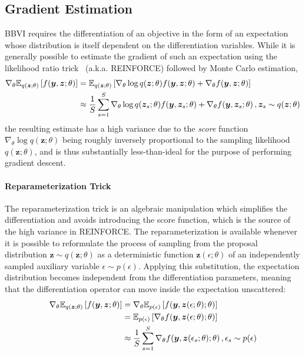 \documentclass[11pt]{article}
\begin{document}
\subsection{Gradient Estimation}

BBVI requires the differentiation of an objective in the form of an expectation
whose distribution is itself dependent on the differentiation variables.  While
it is generally possible to estimate the gradient of such an expectation using
the likelihood ratio trick~\cite{williams_simple_1992} (a.k.a. REINFORCE)
followed by Monte Carlo estimation,
%
\begin{align}
  \nabla_\theta {\mathbb{E}}_{q(\bm z;\theta)}\left[ f(\bm y, \bm z; \theta) \right] &=
  {\mathbb{E}}_{q(\bm z;\theta)}\left[ \nabla_\theta \log q(\bm z;\theta) f(\bm y, \bm
  z; \theta) + \nabla_\theta f(\bm y, \bm z; \theta) \right] \nonumber \\
  &\approx \frac{1}{S} \sum_{s=1}^S \nabla_\theta \log q(\bm z_s; \theta) f(\bm
  y, \bm z_s; \theta) + \nabla_\theta f(\bm y, \bm z_s; \theta) \,, \bm z_s
  \sim q(\bm z; \theta)
\end{align}
%
\noindent the resulting estimate has a high variance due to the \emph{score}
function $\nabla_\theta \log q(\bm z; \theta)$ being roughly inversely
proportional to the sampling likelihood $q(\bm z; \theta)$, and is thus
substantially less-than-ideal for the purpose of performing gradient descent.

\paragraph{Reparameterization Trick}

The reparameterization trick is an algebraic manipulation which simplifies the
differentiation and avoids introducing the score function, which is the source
of the high variance in REINFORCE\@.  The reparameterization is available
whenever it is possible to reformulate the process of sampling from the
proposal distribution $\bm z\sim q(\bm z; \theta)$ as a deterministic function
$\bm z(\epsilon; \theta)$ of an independently sampled auxiliary variable
$\epsilon\sim p(\epsilon)$.  Applying this substitution, the expectation
distribution becomes independent from the differentiation parameters, meaning
that the differentiation operator can move inside the expectation unscattered:
%
\begin{align}
  \nabla_\theta {\mathbb{E}}_{q(\bm z; \theta)}\left[ f(\bm y, \bm z; \theta) \right] &=
  \nabla_\theta {\mathbb{E}}_{p(\epsilon)}\left[ f(\bm y, \bm z(\epsilon; \theta); \theta) \right] \nonumber \\
  &= {\mathbb{E}}_{p(\epsilon)}\left[ \nabla_\theta f(\bm y, \bm z(\epsilon; \theta); \theta) \right] \nonumber \\
  &\approx \frac{1}{S} \sum_{s=1}^S \nabla_\theta f(\bm y, \bm z(\epsilon_s; \theta); \theta)\,, \epsilon_s \sim p(\epsilon)
\end{align}
\end{document}
